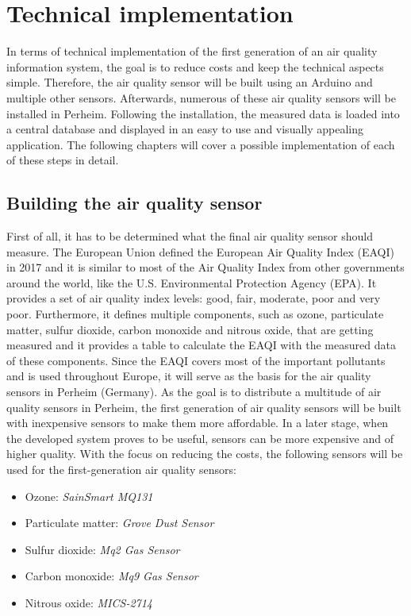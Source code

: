 \documentclass[conference]{IEEEtran}
\begin{document}
\section{Technical implementation} \label{sec:TechnicalImplementation}
In terms of technical implementation of the first generation of an air quality information system, the goal is to reduce costs and keep the technical aspects simple. Therefore, the air quality sensor will be built using an Arduino and multiple other sensors. Afterwards, numerous of these air quality sensors will be installed in Perheim. Following the installation, the measured data is loaded into a central database and displayed in an easy to use and visually appealing application. The following chapters will cover a possible implementation of each of these steps in detail.

\subsection{Building the air quality sensor}
First of all, it has to be determined what the final air quality sensor should measure. The European Union defined the European Air Quality Index (EAQI) in 2017 and it is similar to most of the Air Quality Index from other governments around the world, like the U.S. Environmental Protection Agency (EPA). It provides a set of air quality index levels: good, fair, moderate, poor and very poor. Furthermore, it defines multiple components, such as ozone, particulate matter, sulfur dioxide, carbon monoxide and nitrous oxide, that are getting measured and it provides a table to calculate the EAQI with the measured data of these components. Since the EAQI covers most of the important pollutants and is used throughout Europe, it will serve as the basis for the air quality sensors in Perheim (Germany). As the goal is to distribute a multitude of air quality sensors in Perheim, the first generation of air quality sensors will be built with inexpensive sensors to make them more affordable. In a later stage, when the developed system proves to be useful, sensors can be more expensive and of higher quality. With the focus on reducing the costs, the following sensors will be used for the first-generation air quality sensors:

\begin{itemize}
\item Ozone: \textit{SainSmart MQ131}\cite{.d}
\item Particulate matter: \textit{Grove Dust Sensor}\cite{Bill.27.04.2019c}
\item Sulfur dioxide: \textit{Mq2 Gas Sensor}\cite{Bill.27.04.2019}
\item Carbon monoxide: \textit{Mq9 Gas Sensor}\cite{Bill.27.04.2019b}
\item Nitrous oxide: \textit{MICS-2714}\cite{.c}
\end{itemize}
\end{document}
